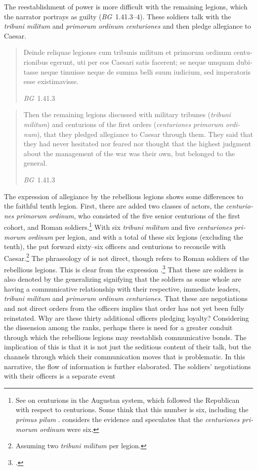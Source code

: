 \documentclass[12pt,letterpaper,oneside,final]{memoir}
\begin{document}
The reestablishment of power is more difficult with the remaining legions, which the narrator portrays as guilty (\emph{BG}~1.41.3--4). These soldiers talk with the \emph{tribuni militum} and \emph{\textlatin{primorum ordinum centuriones}} and then pledge allegiance to Caesar. \blockquote[\emph{BG}~1.41.3]{\textlatin{Deinde reliquae legiones cum tribunis militum et primorum ordinum centurionibus egerunt, uti per eos Caesari satis facerent; se neque umquam dubitasse neque timuisse neque de summa belli suum iudicium, sed imperatoris esse existimavisse.}} \blockquote[\emph{BG}~1.41.3]{Then the remaining legions discussed with military tribunes (\emph{tribuni militum}) and centurions of the first orders (\emph{\textlatin{centuriones primorum ordinum}}), that they pledged allegiance to Caesar through them. They said that they had never hesitated nor feared nor thought that the highest judgment about the management of the war was their own, but belonged to the general.} The expression of allegiance by the rebellious legions shows some differences to the faithful tenth legion. First, there are added two classes of actors, the \emph{\textlatin{centuriones primorum ordinum}}, who consisted of the five senior centurions of the first cohort, and Roman soldiers.\footnote{See \textcite[191--192]{gilliver2007} on centurions in the Augustan system, which followed the Republican with respect to centurions. Some think that this number is six, including the \emph{primus pilum} \parencite[191]{gilliver2007}. \textcite[58-59]{holmes1914a} considers the evidence and speculates that the \emph{\textlatin{centuriones primorum ordinum}} were six.} With six \emph{tribuni militum} and five \emph{\textlatin{centuriones primorum ordinum}} per legion, and with a total of these six legions (excluding the tenth), the  put forward sixty--six officers and centurions to reconcile with Caesar.\footnote{Assuming two \emph{tribuni militum} per legion.} The phraseology of  is not direct, though refers to Roman soldiers of the rebellious legions. This is clear from the expression .\footnote{.} That these are soldiers is also denoted by the generalizing  signifying that the soldiers as some whole are having a communicative relationship with their respective, immediate leaders, \emph{tribuni militum} and \emph{primorum ordinum centuriones}. That these are negotiations and not direct orders from the officers implies that order has not yet been fully reinstated. Why are these thirty additional officers pledging loyalty? Considering the dissension among the ranks, perhaps there is need for a greater conduit through which the rebellious legions may reestablish communicative bonds. The implication of this is that it is not just the seditious content of their talk, but the channels through which their communication moves that is problematic. In this narrative, the flow of information is further elaborated. The soldiers' negotiations with their officers is a separate event 
\end{document}
